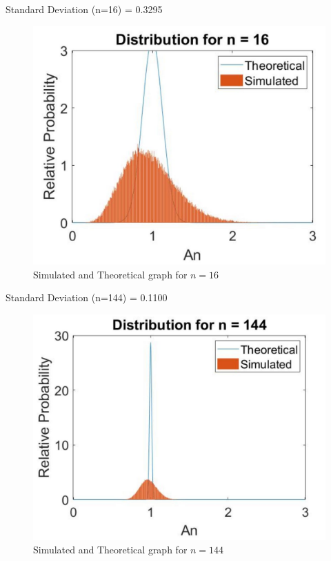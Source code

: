 \documentclass{article}
\begin{document}
\vspace*{1.5cm}
Standard Deviation (n=16) = 0.3295
\begin{figure}[h!]
\centering
\includegraphics[scale=0.8]{Cpart1_3.jpg}
\caption{Simulated and Theoretical graph for $n = 16$}
\end{figure}

Standard Deviation (n=144) = 0.1100
\begin{figure}[h!]
\centering
\includegraphics[scale=0.8]{Cpart1_4.jpg}
\caption{Simulated and Theoretical graph for $n = 144$}
\end{figure}
\end{document}
